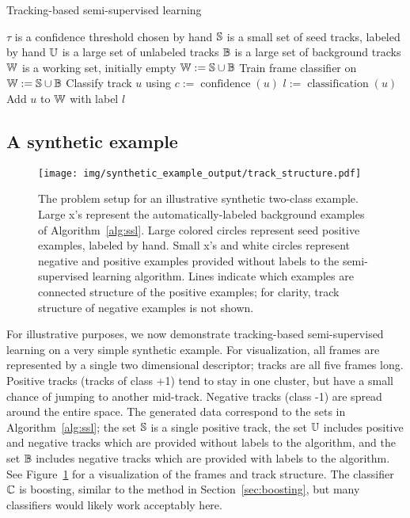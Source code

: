 \documentclass[conference]{IEEEtran}
\begin{document}
\begin{algorithm}[h]
  \caption{Tracking-based semi-supervised learning}
  \label{alg:ssl}
  \begin{algorithmic}
    \STATE $\tau$ is a confidence threshold chosen by hand
    \STATE $\S$ is a small set of seed tracks, labeled by hand
    \STATE $\U$ is a large set of unlabeled tracks
    \STATE $\B$ is a large set of background tracks
    \STATE $\W$ is a working set, initially empty
    \STATE
    \STATE $\W := \S \cup \B$
    \REPEAT
    \STATE Train frame classifier \C on \W
    \STATE $\W := \S \cup \B$
    \STATE Classify track $u$ using \C
    \STATE $c := \operatorname{confidence}(u)$
    \STATE $l := \operatorname{classification}(u)$
    \STATE Add $u$ to $\W$ with label $l$
    \ENDIF
    \ENDFOR
  \end{algorithmic}
\end{algorithm}


\subsection{A synthetic example}


\begin{figure}
  \centering
  \texttt{[image: img/synthetic\_example\_output/track\_structure.pdf]}
  \caption{The problem setup for an illustrative synthetic two-class example.  Large x's represent the automatically-labeled background examples of Algorithm~\ref{alg:ssl}.  Large colored circles represent seed positive examples, labeled by hand.  Small x's and white circles represent negative and positive examples provided without labels to the semi-supervised learning algorithm.  Lines indicate which examples are connected  structure of the positive examples; for clarity, track structure of negative examples is not shown.}
  \label{fig:synth_track_structure}
\end{figure}

For illustrative purposes, we now demonstrate tracking-based semi-supervised learning on a very simple synthetic example.  For visualization, all frames are represented by a single two dimensional descriptor; tracks are all five frames long.  Positive tracks (\ie tracks of class +1) tend to stay in one cluster, but have a small chance of jumping to another mid-track.  Negative tracks (class -1) are spread around the entire space.  The generated data correspond to the sets in Algorithm~\ref{alg:ssl}; the set $\S$ is a single positive track, the set $\U$ includes positive and negative tracks which are provided without labels to the algorithm, and the set $\B$ includes negative tracks which are provided with labels to the algorithm.  See Figure~\ref{fig:synth_track_structure} for a visualization of the frames and track structure.  The classifier $\C$ is boosting, similar to the method in Section~\ref{sec:boosting}, but many classifiers would likely work acceptably here.
\end{document}
